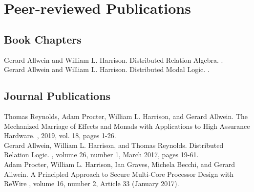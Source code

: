 \documentclass[12pt]{article} %
\begin{document}

\section*{Peer-reviewed Publications}

\subsection*{Book Chapters}

Gerard Allwein and William L. Harrison.
\newblock Distributed Relation Algebra.
.
\\

Gerard Allwein and William L. Harrison.
\newblock Distributed Modal Logic.
.

\subsection*{Journal Publications}


Thomas Reynolds, Adam Procter, William L. Harrison, and Gerard Allwein.
\newblock The Mechanized Marriage of Effects and Monads with Applications to High Assurance Hardware.
, 2019, vol. 18, pages 1-26. 
\\


Gerard Allwein, William L. Harrison, and Thomas Reynolds.
\newblock Distributed Relation Logic.
, volume 26, number 1, March 2017, pages 19-61.
\\


Adam Procter, William L. Harrison, Ian Graves, Michela Becchi, and Gerard Allwein.
\newblock A Principled Approach to Secure Multi-Core Processor Design with ReWire
, volume 16, number 2, Article 33 (January 2017).
\\
\end{document}
